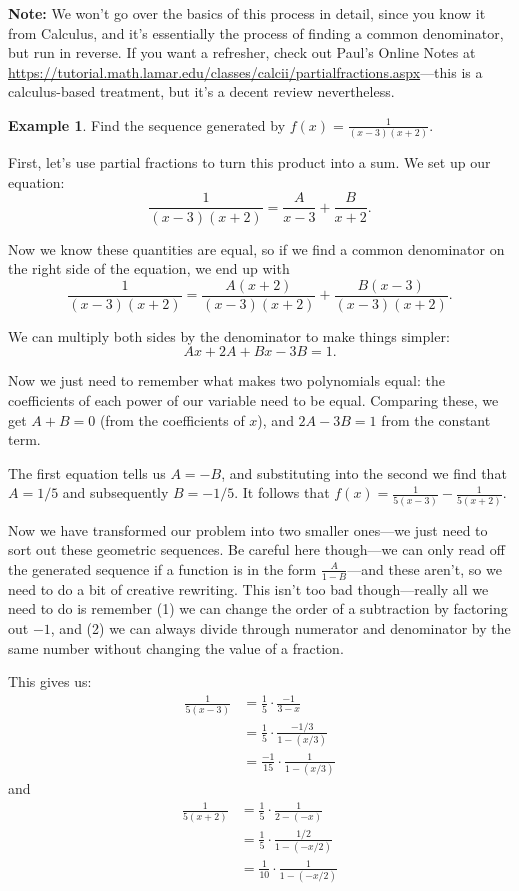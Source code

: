 \documentclass{article}
\theoremstyle{definition}
\newtheorem{example}{Example}
\begin{document}
\textbf{Note:} We won't go over the basics of this process in detail, since you know it from Calculus, and it's essentially the process of finding a common denominator, but run in reverse. If you want a refresher, check out Paul's Online Notes at \href{https://tutorial.math.lamar.edu/classes/calcii/partialfractions.aspx}{https://tutorial.math.lamar.edu/classes/calcii/partialfractions.aspx}---this is a calculus-based treatment, but it's a decent review nevertheless.

\begin{example}
Find the sequence generated by $f(x)=\frac{1}{(x-3)(x+2)}$.

First, let's use partial fractions to turn this product into a sum. We set up our equation:
\[\frac{1}{(x-3)(x+2)}=\frac{A}{x-3}+\frac{B}{x+2}.\]

Now we know these quantities are equal, so if we find a common denominator on the right side of the equation, we end up with
\[\frac{1}{(x-3)(x+2)}=\frac{A(x+2)}{(x-3)(x+2)}+\frac{B(x-3)}{(x-3)(x+2)}.\]

We can multiply both sides by the denominator to make things simpler:
\[A x+2 A+B x-3 B=1.\]

Now we just need to remember what makes two polynomials equal: the coefficients of each power of our variable need to be equal. Comparing these, we get $A+B=0$ (from the coefficients of $x$), and $2 A-3 B=1$ from the constant term.

The first equation tells us $A=-B$, and substituting into the second we find that $A=1/5$ and subsequently $B=-1/5$. It follows that $f(x)=\frac{1}{5(x-3)}-\frac{1}{5(x+2)}$.

Now we have transformed our problem into two smaller ones---we just need to sort out these geometric sequences. Be careful here though---we can only read off the generated sequence if a function is in the form $\frac{A}{1-B}$---and these aren't, so we need to do a bit of creative rewriting. This isn't too bad though---really all we need to do is remember (1) we can change the order of a subtraction by factoring out $-1$, and (2) we can always divide through numerator and denominator by the same number without changing the value of a fraction.

This gives us:
\begin{align}
\frac{1}{5(x-3)} &= \frac{1}{5} \cdot \frac{-1}{3-x} \\
&= \frac{1}{5} \cdot \frac{-1/3}{1-(x/3)} \\
&= \frac{-1}{15} \cdot \frac{1}{1-(x/3)}
\end{align}
and
\begin{align}
\frac{1}{5(x+2)} &= \frac{1}{5} \cdot \frac{1}{2-(-x)} \\
&= \frac{1}{5} \cdot \frac{1/2}{1-(-x/2)} \\
&= \frac{1}{10} \cdot \frac{1}{1-(-x/2)}
\end{align}


\end{example}
\end{document}
